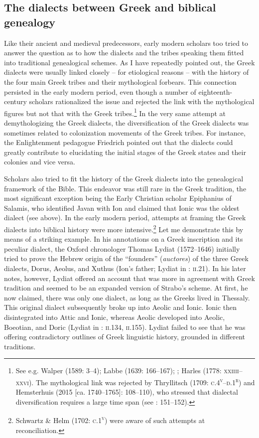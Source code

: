 \documentclass[output=paper]{langsci/langscibook}
\begin{document}
\subsection{The dialects between Greek and biblical genealogy}
\hypertarget{Toc19704837}{}
Like their ancient and medieval predecessors, early modern scholars too tried to answer the question as to how the dialects and the tribes speaking them fitted into traditional genealogical schemes. As I have repeatedly pointed out, the Greek dialects were usually linked closely – for etiological reasons – with the history of the four main Greek tribes and their mythological forbears. This connection persisted in the early modern period, even though a number of eighteenth-century scholars rationalized the issue and rejected the link with the mythological figures but not that with the Greek tribes.\footnote{See e.g. Walper (1589: 3–4); Labbe (1639: 166–167); \citet[73]{Vitringa1689}; Harles (1778: \textsc{xxiiii–xxvi}). The mythological link was rejected by Thryllitsch (1709: \textsc{c.4}\textsc{\textsuperscript{v}}\textsc{–d.1}\textsc{\textsuperscript{r}}) and Hemsterhuis (2015 [ca. 1740–1765]: 108–110), who stressed that dialectal diversification requires a large time span (see \citealt{Gerretzen1940}: 151–152).} In the very same attempt at demythologizing the Greek dialects, the diversification of the Greek dialects was sometimes related to colonization movements of the Greek tribes. For instance, the Enlightenment pedagogue Friedrich \citet[12]{Gedike1782} pointed out that the dialects could greatly contribute to elucidating the initial stages of the Greek states and their colonies and vice versa.

Scholars also tried to fit the history of the Greek dialects into the genealogical framework of the Bible. This endeavor was still rare in the Greek tradition, the most significant exception being the Early Christian scholar Epiphanius of Salamis, who identified Javan with Ion and claimed that Ionic was the oldest dialect (see  above). In the early modern period, attempts at framing the Greek dialects into biblical history were more intensive.\footnote{Schwartz \& Helm (1702: \textsc{c.1}\textsc{\textsuperscript{v}}) were aware of such attempts at reconciliation.} Let me demonstrate this by means of a striking example. In his annotations on a Greek inscription and its peculiar dialect, the Oxford chronologer Thomas Lydiat (1572–1646) initially tried to prove the Hebrew origin of the “founders” (\textit{auctores}) of the three Greek dialects, Dorus, Aeolus, and Xuthus (Ion’s father; Lydiat in \citealt{Prideaux1676}: \textsc{ii}.21). In his later notes, however, Lydiat offered an account that was more in agreement with Greek tradition and seemed to be an expanded version of Strabo’s scheme. At first, he now claimed, there was only one dialect, as long as the Greeks lived in Thessaly. This original dialect subsequently broke up into Aeolic and Ionic. Ionic then disintegrated into Attic and Ionic, whereas Aeolic developed into Aeolic, Boeotian, and Doric (Lydiat in \citealt{Prideaux1676}: \textsc{ii.134}, \textsc{ii.}155). Lydiat failed to see that he was offering contradictory outlines of Greek linguistic history, grounded in different traditions.
\end{document}
